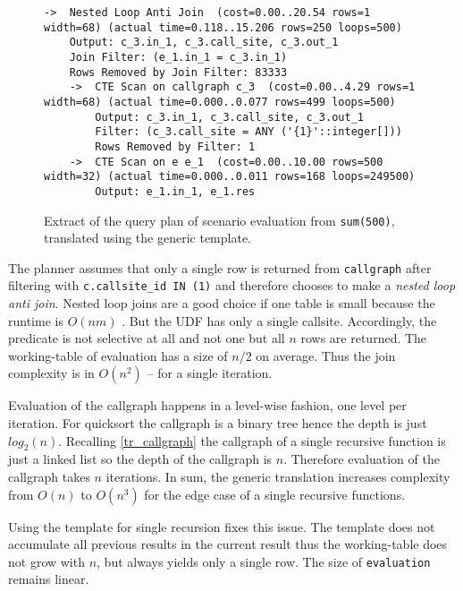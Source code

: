 \begin{figure}[h!]
    \centering\scriptsize
    \begin{verbatim}
->  Nested Loop Anti Join  (cost=0.00..20.54 rows=1 width=68) (actual time=0.118..15.206 rows=250 loops=500)
	Output: c_3.in_1, c_3.call_site, c_3.out_1
	Join Filter: (e_1.in_1 = c_3.in_1)
	Rows Removed by Join Filter: 83333
	->  CTE Scan on callgraph c_3  (cost=0.00..4.29 rows=1 width=68) (actual time=0.000..0.077 rows=499 loops=500)
	    Output: c_3.in_1, c_3.call_site, c_3.out_1
	    Filter: (c_3.call_site = ANY ('{1}'::integer[]))
	    Rows Removed by Filter: 1
	->  CTE Scan on e e_1  (cost=0.00..10.00 rows=500 width=32) (actual time=0.000..0.011 rows=168 loops=249500)
	    Output: e_1.in_1, e_1.res
    \end{verbatim}
    \caption{Extract of the query plan of scenario evaluation from \texttt{sum(500)}, translated using the generic template.}
    \label{plan:sum}
\end{figure}

The planner assumes that only a single row is returned from \texttt{callgraph} after filtering with \texttt{c.callsite\_id IN (1)} and therefore chooses to make a \textit{nested loop anti join}. Nested loop joins are a good choice if one table is small because the runtime is $O(nm)$ \cite[p. 454]{DMS}. But the UDF has only a single callsite. Accordingly, the predicate is not selective at all and not one but all $n$ rows are returned. The working-table of evaluation has a size of $n/2$ on average. Thus the join complexity is in $O(n^2)$ -- for a single iteration. 

Evaluation of the callgraph happens in a level-wise fashion, one level per iteration. For quicksort the callgraph is a binary tree hence the depth is just $log_2(n)$. Recalling \autoref{tr_callgraph} the callgraph of a single recursive function is just a linked list so the depth of the callgraph is $n$. Therefore evaluation of the callgraph takes $n$ iterations. In sum, the generic translation increases complexity from $O(n)$ to $O(n^3)$ for the edge case of a single recursive functions.

Using the template for single recursion fixes this issue. The template does not accumulate all previous results in the current result thus the working-table does not grow with $n$, but always yields only a single row. The size of \texttt{evaluation} remains linear.





